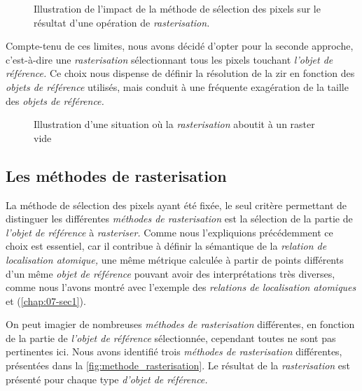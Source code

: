 \begin{figure}
  \centering
  
  \caption{Illustration de l'impact de la méthode de sélection des
    pixels sur le résultat d'une opération de \emph{rasterisation.}}
  \label{fig:rasterisation_sel_pixels}
\end{figure}

Compte-tenu de ces limites, nous avons décidé d'opter pour la seconde
approche, c'est-à-dire une \emph{rasterisation} sélectionnant tous les
pixels touchant \emph{l'objet de référence.} Ce choix nous dispense de
définir la résolution de la \ac{zir} en fonction des \emph{objets de
  référence} utilisés, mais conduit à une fréquente exagération de la
taille des \emph{objets de référence.}

\begin{wrapfigure}{r}{4cm}
  \centering
  
  \caption{Illustration d'une situation où la \emph{rasterisation}
    aboutit à un raster vide}
  \label{fig:rasterisation_cas_limite}
\end{wrapfigure}

\subsection{Les méthodes de rasterisation}

La méthode de sélection des pixels ayant été fixée, le seul critère
permettant de distinguer les différentes \emph{méthodes de
  rasterisation} est la sélection de la partie de \emph{l'objet de
  référence} à \emph{rasteriser.} Comme nous l'expliquions
précédemment ce choix est essentiel, car il contribue à définir la
sémantique de la \emph{relation de localisation atomique,} une même
métrique calculée à partir de points différents d'un même \emph{objet
  de référence} pouvant avoir des interprétations très diverses, comme
nous l'avons montré avec l'exemple des \emph{relations de localisation
  atomiques}  et
 (\autoref{chap:07-sec1}).

On peut imagier de nombreuses \emph{méthodes de rasterisation}
différentes, en fonction de la partie de \emph{l'objet de référence}
sélectionnée, cependant toutes ne sont pas pertinentes ici. Nous avons
identifié trois \emph{méthodes de rasterisation} différentes,
présentées dans la \ref{fig:methode_rasterisation}. Le résultat de la
\emph{rasterisation} est présenté pour chaque type \emph{d'objet de
  référence.}

